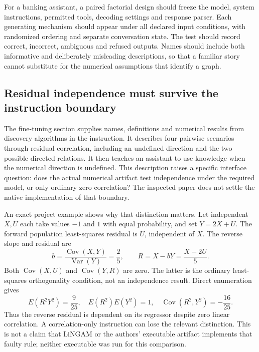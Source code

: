 For a banking assistant, a paired factorial design should freeze the model,
system instructions, permitted tools, decoding settings and response parser.
Each generating mechanism should appear under all declared input conditions,
with randomized ordering and separate conversation state. The test should
record correct, incorrect, ambiguous and refused outputs. Names should include
both informative and deliberately misleading descriptions, so that a familiar
story cannot substitute for the numerical assumptions that identify a graph.

\subsection{Residual independence must survive the instruction boundary}
\label{exec20:pa-residual}
The fine-tuning section supplies names, definitions and numerical results from
discovery algorithms in the instruction. It describes four pairwise scenarios
through residual correlation, including an undefined direction and the two
possible directed relations. It then teaches an assistant to use knowledge
when the numerical direction is undefined. This description raises a specific
interface question: does the actual numerical artifact test independence under
the required model, or only ordinary zero correlation? The inspected paper
does not settle the native implementation of that boundary.
\citep{exec20_attribution}

An exact project example shows why that distinction matters. Let independent
$X,U$ each take values $-1$ and $1$ with equal probability, and set $Y=2X+U$.
The forward population least-squares residual is $U$, independent of $X$.
The reverse slope and residual are
\begin{equation}
 b=\frac{\operatorname{Cov}(X,Y)}{\operatorname{Var}(Y)}=\frac25,
 \qquad R=X-bY=\frac{X-2U}{5}.
 \label{exec20:pa-reverse}
\end{equation}
Both $\operatorname{Cov}(X,U)$ and $\operatorname{Cov}(Y,R)$ are zero.
The latter is the ordinary least-squares orthogonality condition, not an
independence result. Direct enumeration gives
\begin{equation}
 E(R^2Y^2)=\frac9{25},\quad E(R^2)E(Y^2)=1,
 \quad \operatorname{Cov}(R^2,Y^2)=-\frac{16}{25}.
 \label{exec20:pa-dependence}
\end{equation}
Thus the reverse residual is dependent on its regressor despite zero linear
correlation. A correlation-only instruction can lose the relevant distinction.
This is not a claim that LiNGAM or the authors' executable artifact implements
that faulty rule; neither executable was run for this comparison.
\citep{exec20_population_attribution_reference}

